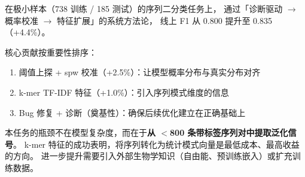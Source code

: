 \documentclass[11pt,a4paper]{article}
\begin{document}
在极小样本（738 训练 / 185 测试）的序列二分类任务上，
通过「诊断驱动 $\to$ 概率校准 $\to$ 特征扩展」的系统方法论，
线上 F1 从 0.800 提升至 0.835（+4.4\%）。

核心贡献按重要性排序：
\begin{enumerate}[nosep]
    \item 阈值上探 + spw 校准（+2.5\%）：让模型概率分布与真实分布对齐
    \item k-mer TF-IDF 特征（+1.0\%）：引入序列模式维度的信息
    \item Bug 修复 + 诊断（奠基性）：确保后续优化建立在正确基础上
\end{enumerate}

本任务的瓶颈不在模型复杂度，而在于\textbf{从 $<$800 条带标签序列对中提取泛化信号}。
k-mer 特征的成功表明，将序列转化为统计模式向量是最低成本、最高收益的方向。
进一步提升需要引入外部生物学知识（自由能、预训练嵌入）或扩充训练数据。
\end{document}
